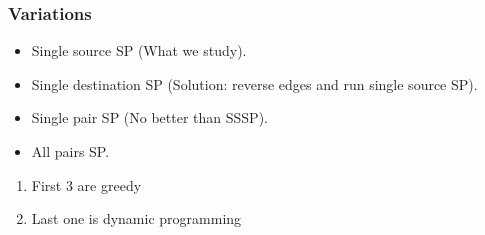 \subsubsection{Variations}
\begin{summary}
    \begin{itemize}
        \item Single source SP (What we study).
        \item Single destination SP (Solution: reverse edges and run single source SP).
        \item Single pair SP (No better than SSSP).
        \item All pairs SP.
    \end{itemize}
    \begin{enumerate}
        \item First 3 are greedy 
        \item Last one is dynamic programming
    \end{enumerate}
\end{summary}

